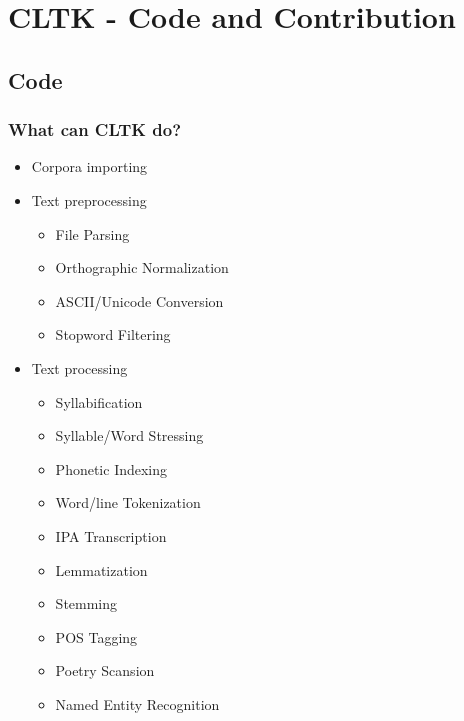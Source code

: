 \documentclass{beamer}
\begin{document}
\section{CLTK - Code and Contribution}



\subsection{Code}

\begin{frame}
\frametitle{What can CLTK do?}
\begin{itemize}
    \item Corpora importing
    \item Text preprocessing
    \begin{itemize}
        \item File Parsing
        \item Orthographic Normalization
        \item ASCII/Unicode Conversion
        \item Stopword Filtering
    \end{itemize}
    \item Text processing
    \begin{itemize}
    \item Syllabification
    \item Syllable/Word Stressing
    \item Phonetic Indexing
    \item Word/line Tokenization
    \item IPA Transcription
    \item Lemmatization
    \item Stemming
    \item POS Tagging
    \item Poetry Scansion
    \item Named Entity Recognition
    \end{itemize}
\end{itemize}
\end{frame}
\end{document}
